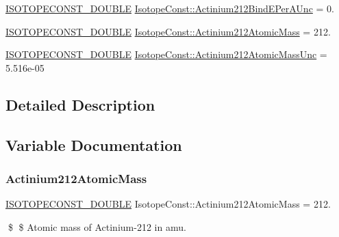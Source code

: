 \begin{DoxyCompactItemize}
\mbox{\hyperlink{group___isotope_const-_macros_ga8f45a7272ce02c0b4c65c44636ed719a}{I\+S\+O\+T\+O\+P\+E\+C\+O\+N\+S\+T\+\_\+\+D\+O\+U\+B\+LE}} \mbox{\hyperlink{group___isotope_const-_actinium-_ac212_ga7e93acb33e4070f67624d088702bd11b}{Isotope\+Const\+::\+Actinium212\+Bind\+E\+Per\+A\+Unc}} = 0.
\item 
\mbox{\hyperlink{group___isotope_const-_macros_ga8f45a7272ce02c0b4c65c44636ed719a}{I\+S\+O\+T\+O\+P\+E\+C\+O\+N\+S\+T\+\_\+\+D\+O\+U\+B\+LE}} \mbox{\hyperlink{group___isotope_const-_actinium-_ac212_ga6baf1f7653c2a5df7198297aa525c676}{Isotope\+Const\+::\+Actinium212\+Atomic\+Mass}} = 212.
\item 
\mbox{\hyperlink{group___isotope_const-_macros_ga8f45a7272ce02c0b4c65c44636ed719a}{I\+S\+O\+T\+O\+P\+E\+C\+O\+N\+S\+T\+\_\+\+D\+O\+U\+B\+LE}} \mbox{\hyperlink{group___isotope_const-_actinium-_ac212_ga92119465f109a9057110fc9af1f29da5}{Isotope\+Const\+::\+Actinium212\+Atomic\+Mass\+Unc}} = 5.\+516e-\/05
\end{DoxyCompactItemize}


\subsection{Detailed Description}


\subsection{Variable Documentation}
\mbox{\label{group___isotope_const-_actinium-_ac212_ga6baf1f7653c2a5df7198297aa525c676}} 
\subsubsection{\texorpdfstring{Actinium212\+Atomic\+Mass}{Actinium212AtomicMass}}
{\footnotesize\ttfamily \mbox{\hyperlink{group___isotope_const-_macros_ga8f45a7272ce02c0b4c65c44636ed719a}{I\+S\+O\+T\+O\+P\+E\+C\+O\+N\+S\+T\+\_\+\+D\+O\+U\+B\+LE}} Isotope\+Const\+::\+Actinium212\+Atomic\+Mass = 212.}

\$ \$ Atomic mass of Actinium-\/212 in amu. \mbox{\label{group___isotope_const-_actinium-_ac212_ga92119465f109a9057110fc9af1f29da5}} 
